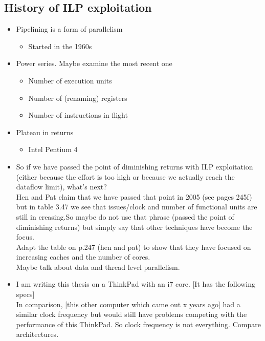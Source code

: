 \documentclass[12pt,a4paper]{article}
\newcommand{\note}{\textcolor{WildStrawberry}}
\begin{document}
\subsection{History of ILP exploitation}
\begin{itemize}
	\item Pipelining is a form of parallelism
				\begin{itemize}
					\item Started in the 1960s
				\end{itemize}
	\item Power series. Maybe examine the most recent one
				\begin{itemize}
					\item Number of execution units
					\item Number of (renaming) registers
					\item  Number of instructions in flight
				\end{itemize}
	\item Plateau in returns
				\begin{itemize}
					\item Intel Pentium 4
				\end{itemize}
	\item So if we have passed the point of diminishing returns with ILP exploitation (either because the effort is too high or because we actually reach the dataflow limit), what's next?\\
	\note{Hen and Pat claim that we have passed that point in 2005 (see pages 245f) but in table 3.47 we see that issues/clock and number of functional units are still in creasing.So maybe do not use that phrase (passed the point of diminishing returns) but simply say that other techniques have become the focus.\\
	Adapt the table on p.247 (hen and pat) to show that they have focused on increasing caches and the number of cores.}\\
	Maybe talk about data and thread level parallelism.
	\item I am writing this thesis on a ThinkPad with an i7 core. [It has the following specs]\\
	In comparison, [this other computer which came out x years ago] had a similar clock frequency but would still have problems competing with the performance of this ThinkPad. So clock frequency is not everything. \note{Compare architectures}.
	
\end{itemize}
\end{document}
